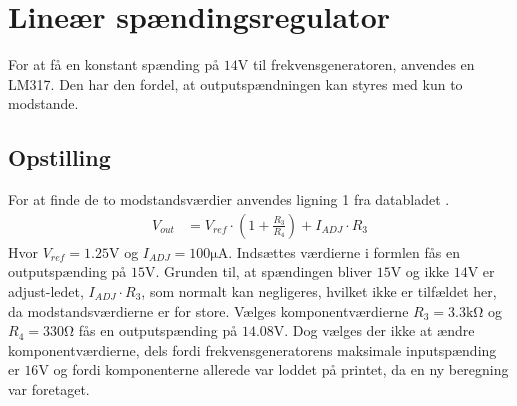 \section{Lineær spændingsregulator}\label{sec:lm317}
For at få en konstant spænding på $14\si{\volt}$ til frekvensgeneratoren, anvendes en LM317. Den har den fordel, at outputspændningen kan styres med kun to modstande.
\subsection{Opstilling}
For at finde de to modstandsværdier anvendes ligning 1 fra databladet \cite[Side. 10]{LM317}.
\begin{align}
	V_{out} & = V_{ref} \cdot \left( 1 + \frac{R_3}{R_4} \right) + I_{ADJ} \cdot R_3 \label{eq:lm317_formel}
\end{align}
Hvor $V_{ref} = 1.25\si{\volt}$ og $I_{ADJ} = 100\si{\micro\ampere}$. Indsættes værdierne i formlen fås en outputspænding på $15\si{\volt}$. Grunden til, at spændingen bliver $15\si{\volt}$ og ikke $14\si{\volt}$ er adjust-ledet, $I_{ADJ} \cdot R_3$, som normalt kan negligeres, hvilket ikke er tilfældet her, da modstandsværdierne er for store. Vælges komponentværdierne $R_3 = 3.3\si{\kilo\ohm}$ og $R_4 = 330\si{\ohm}$ fås en outputspænding på $14.08\si{\volt}$. Dog vælges der ikke at ændre komponentværdierne, dels fordi frekvensgeneratorens maksimale inputspænding er $16\si{\volt}$ og fordi komponenterne allerede var loddet på printet, da en ny beregning var foretaget.